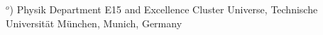 \documentclass[11pt,a4paper]{article}
\begin{document}
\begin{titlepage}
\begin{center}
$^o$)  Physik Department E15 and Excellence Cluster Universe, Technische  Universit{\"a}t M{\"u}nchen, Munich, Germany\\[1mm]                           
\vspace*{20mm}


\end{center}
\end{titlepage}
\end{document}
